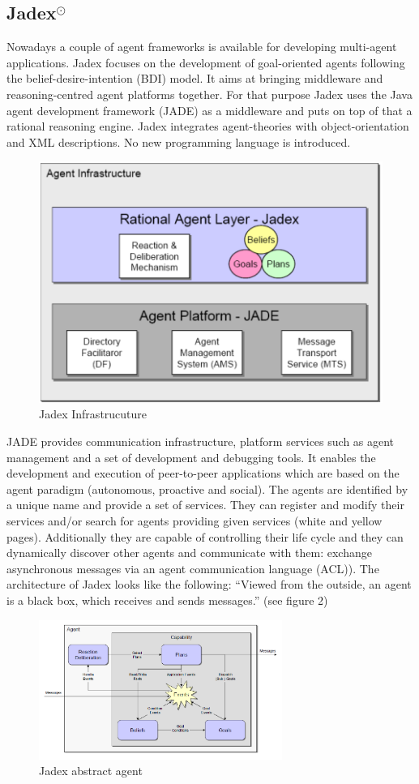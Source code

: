 \subsection{Jadex$^\odot$}
Nowadays a couple of agent frameworks is available for developing multi-agent applications. \cite{Mangina} Jadex focuses on the development of goal-oriented agents following the belief-desire-intention (BDI) model. It aims at bringing middleware and reasoning-centred agent platforms together. For that purpose Jadex uses the Java agent development framework (JADE) as a middleware and puts on top of that a rational reasoning engine. Jadex integrates agent-theories with object-orientation and XML descriptions. No new programming language is introduced. 
\begin{figure}
	\centering
	\includegraphics{images/Jadex_infrastructure.png}
	\caption{Jadex Infrastrucuture}
	\label{fig1}
\end{figure}
JADE provides communication infrastructure, platform services such as agent management and a set of development and debugging tools. It enables the development and execution of  peer-to-peer applications which are based on the agent paradigm (autonomous, proactive and social). The agents are identified by a unique name and provide a set of services. They can register and modify their services and/or search for agents providing given services (white and yellow pages). Additionally they are capable of controlling their life cycle and they can dynamically discover other agents and communicate with them: exchange asynchronous messages via an agent communication language (ACL)). 
The architecture of Jadex looks like the following: "`Viewed from the outside, an agent is a black box, which receives and sends messages."' \cite{Pokahr} (see figure 2)
\begin{figure}
	\centering
	\includegraphics[width=300px]{images/Jadex_agent.png}
	\caption{Jadex abstract agent \cite{Pokahr}}
	\label{fig2}
\end{figure}
